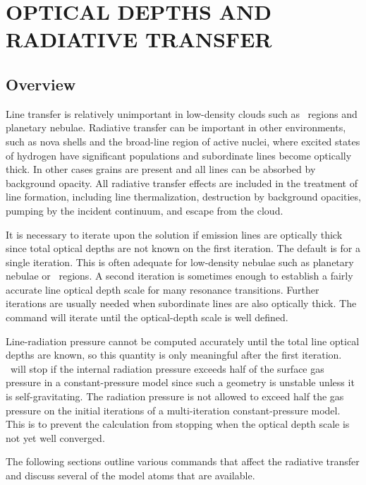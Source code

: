\chapter{OPTICAL DEPTHS AND RADIATIVE TRANSFER}

\section{Overview}

Line transfer is relatively unimportant in
low-density clouds such as \hii\ regions
and planetary nebulae.
Radiative transfer can be important in other
environments,
such as nova shells and the broad-line region of active nuclei,
where excited states of hydrogen have significant
populations and subordinate
lines become optically thick.
In other cases grains are present and all
lines can be absorbed by background opacity.
All radiative transfer effects
are included in the treatment of line formation,
including line thermalization,
destruction by background opacities, pumping by the incident continuum,
and escape from the cloud.

It is necessary to iterate upon the solution if emission lines are
optically thick since total optical depths are not known on the first
iteration.
The default is for a single iteration.
This is
often adequate for low-density nebulae such as planetary nebulae or \hii\ regions.
A second iteration is sometimes enough to establish a fairly
accurate line optical depth scale for many resonance transitions.
Further
iterations are usually needed when subordinate lines are also optically
thick.
The  command
will iterate until the optical-depth scale is well defined.

Line-radiation pressure cannot be computed accurately until the total
line optical depths are known,
so this quantity is only meaningful after
the first iteration.
\Cloudy\ will stop if the internal radiation pressure
exceeds half of the surface gas pressure in a constant-pressure
model since
such a geometry is unstable unless it is self-gravitating.
The radiation
pressure is not allowed to exceed half the gas pressure on the initial
iterations of a multi-iteration constant-pressure model.
This is to prevent
the calculation from stopping when the optical depth scale is
not yet well converged.

The following sections outline various commands that affect the
radiative transfer and discuss several of the model atoms that are available.

